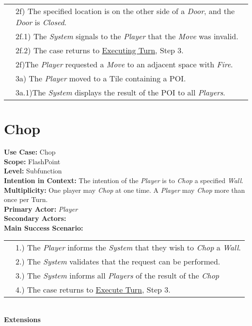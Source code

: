\documentclass{article}
\begin{document}
\begin{tabular}{l l}
		&2f) The specified location is on the other side of a \textit{Door}, and the \textit{Door} is \textit{Closed}.\\
		&\qquad2f.1) The \textit{System} signals to the \textit{Player} that the \textit{Move} was invalid.\\ 
		&\qquad2f.2) The case returns to \underline{Executing Turn}, Step 3.\\
		&2f)The \textit{Player} requested a \textit{Move} to an adjacent space with \textit{Fire}.\\
		&3a) The \textit{Player} moved to a Tile containing a POI.\\
		&\qquad3a.1)The \textit{System} displays the result of the POI to all \textit{Players}.
	\end{tabular}
	
	
	\section*{Chop}
	\textbf{Use Case:} Chop\\
	\textbf{Scope:} FlashPoint\\
	\textbf{Level:} Subfunction\\
	\textbf{Intention in Context: } The intention of the \textit{Player} is to \textit{Chop} a specified \textit{Wall}.\\
	\textbf{Multiplicity: } One player may \textit{Chop} at one time. A \textit{Player} may \textit{Chop} more than once per Turn.\\
	\textbf{Primary Actor:} \textit{Player} \\
	\textbf{Secondary Actors:}\\
	\textbf{Main Success Scenario:}\\
	\begin{tabular}{l l}
		&1.) The \textit{Player} informs the \textit{System} that they wish to \textit{Chop} a \textit{Wall}.\\
		&2.) The \textit{System} validates that the request can be performed.\\
		&3.) The \textit{System} informs all \textit{Players} of the result of the \textit{Chop}\\
		&4.) The case returns to \underline{Execute Turn}, Step 3.\\
	\end{tabular}\\
	\textbf{Extensions}\\
\end{document}
